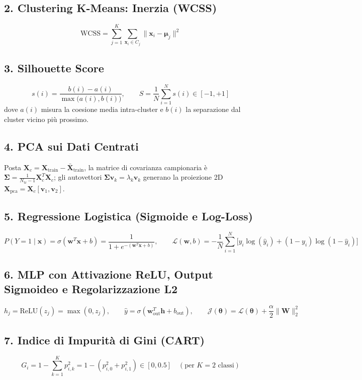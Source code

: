 \documentclass[11pt, a4paper]{article}
\begin{document}
\subsection*{2. Clustering K-Means: Inerzia (WCSS)}
\[
\text{WCSS} = \sum_{j=1}^{K} \sum_{\mathbf{x}_i \in C_j} \|\mathbf{x}_i - \boldsymbol{\mu}_j\|^2
\]

\subsection*{3. Silhouette Score}
\[
s(i) = \frac{b(i) - a(i)}{\max\big(a(i), b(i)\big)}, \qquad S = \frac{1}{N} \sum_{i=1}^{N} s(i) \in [-1, +1]
\]
dove $a(i)$ misura la coesione media intra-cluster e $b(i)$ la separazione dal cluster vicino più prossimo.

\subsection*{4. PCA sui Dati Centrati}
Posta $\mathbf{X}_c = \mathbf{X}_{\text{train}} - \bar{\mathbf{X}}_{\text{train}}$, la matrice di covarianza campionaria è $\boldsymbol{\Sigma} = \frac{1}{N_{\text{tr}}-1} \mathbf{X}_c^T \mathbf{X}_c$; gli autovettori $\boldsymbol{\Sigma} \mathbf{v}_k = \lambda_k \mathbf{v}_k$ generano la proiezione 2D $\mathbf{X}_{\text{pca}} = \mathbf{X}_c [\mathbf{v}_1, \mathbf{v}_2]$.

\subsection*{5. Regressione Logistica (Sigmoide e Log-Loss)}
\[
P(Y=1 \mid \mathbf{x}) = \sigma(\mathbf{w}^T \mathbf{x} + b) = \frac{1}{1 + e^{-(\mathbf{w}^T \mathbf{x} + b)}}, \qquad \mathcal{L}(\mathbf{w}, b) = -\frac{1}{N} \sum_{i=1}^{N} \Big[ y_i \log(\hat{y}_i) + (1 - y_i) \log(1 - \hat{y}_i) \Big]
\]

\subsection*{6. MLP con Attivazione ReLU, Output Sigmoideo e Regolarizzazione L2}
\[
h_j = \text{ReLU}(z_j) = \max(0, z_j), \qquad \hat{y} = \sigma(\mathbf{w}_{\text{out}}^T \mathbf{h} + b_{\text{out}}), \qquad \mathcal{J}(\boldsymbol{\theta}) = \mathcal{L}(\boldsymbol{\theta}) + \frac{\alpha}{2} \|\mathbf{W}\|_2^2
\]

\subsection*{7. Indice di Impurità di Gini (CART)}
\[
G_i = 1 - \sum_{k=1}^{K} p_{i,k}^2 = 1 - (p_{i,0}^2 + p_{i,1}^2) \in [0, 0.5] \quad (\text{per } K=2 \text{ classi})
\]
\end{document}
